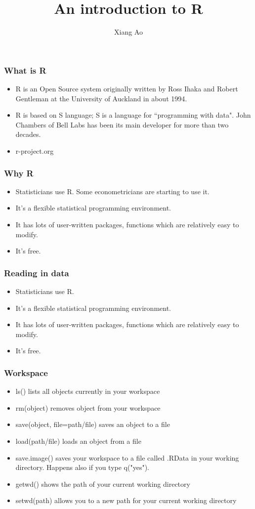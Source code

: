 \documentclass{beamer}
\title{An introduction to R}
\author{Xiang Ao}\institute{HBS}
\begin{document}
\begin{frame}
\titlepage
\end{frame}

\begin{frame}
\frametitle{What is R}
\begin{itemize}
\item R is an Open Source system originally written by Ross Ihaka and
Robert Gentleman at the University of Auckland in about 1994.
\item R is based on S language; S is a language for ``programming with data".
John Chambers of Bell Labs has been its main developer for more than
two decades. \item r-project.org
\end{itemize}
\end{frame}

\begin{frame}
\frametitle{Why R}
\begin{itemize}
\item Statisticians use R.  Some econometricians are starting to use
it.
\item It's a flexible statistical programming environment.
\item It has lots of user-written packages, functions which are relatively easy to modify.
\item It's free.
\end{itemize}
\end{frame}

\begin{frame}
\frametitle{Reading in data}
\begin{itemize}
\item Statisticians use R.
\item It's a flexible statistical programming environment.
\item It has lots of user-written packages, functions which are relatively easy to modify.
\item It's free.
\end{itemize}
\end{frame}


\begin{frame}
\frametitle{Workspace}
\begin{itemize}
\item ls() lists all objects currently in your workspace
\item rm(object) removes object from your workspace
\item save(object, file=path/file) saves an object to a file
\item load(path/file) loads an object from a file
\item save.image() saves your workspace to a file called .RData in your working directory. Happens also if you type q("yes").
\item getwd() shows the path of your current working directory
\item setwd(path) allows you to a new path for your current working directory
\end{itemize}

\end{frame}
\end{document}
